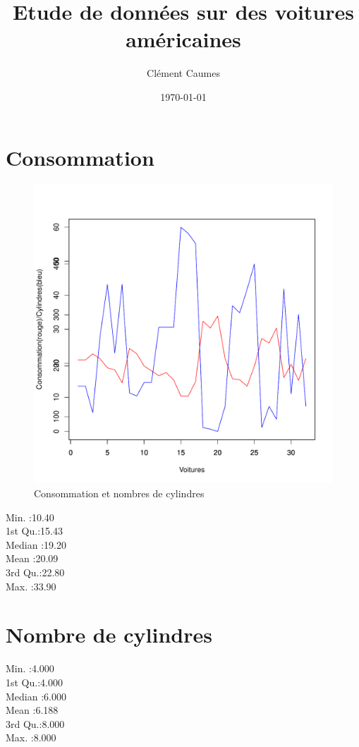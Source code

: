 \documentclass[a4]{article}
\author{Clément Caumes}
\title{Etude de données sur des voitures américaines}
\date{\today}
\begin{document}
\maketitle
\section{Consommation}

\begin{figure}[h]
\includegraphics[scale=0.5]{graphicC.pdf}
\caption{Consommation et nombres de cylindres}
\end{figure}

Min.   :10.40\\
1st Qu.:15.43\\
Median :19.20\\
Mean   :20.09\\
3rd Qu.:22.80\\
Max.   :33.90\\

\section{Nombre de cylindres}
    
Min.   :4.000\\
1st Qu.:4.000\\
Median :6.000\\
Mean   :6.188\\
3rd Qu.:8.000\\
Max.   :8.000\\
\end{document}
